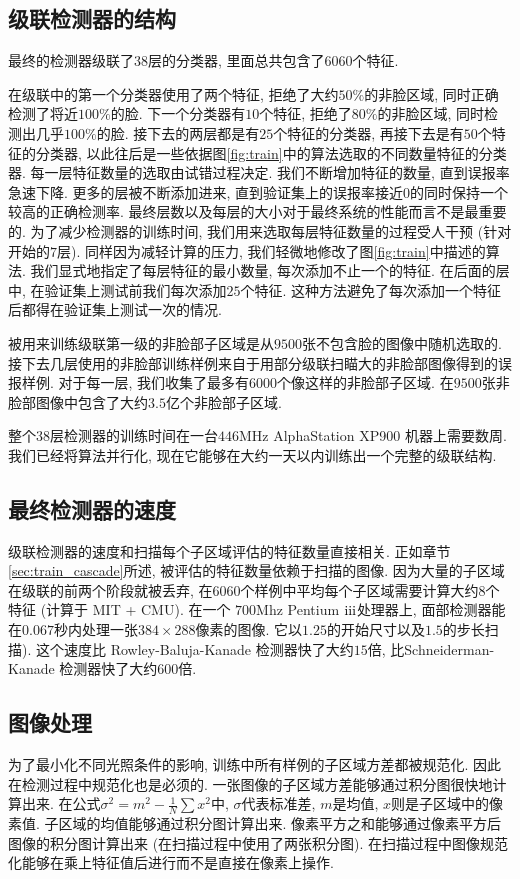 \documentclass[a4paper,utf8,11pt, onecolumn]{ctexart}
\newcommand{\RN}[1]{%
  \textup{\uppercase\expandafter{\romannumeral#1}}%
}
\begin{document}
\subsection{级联检测器的结构}
最终的检测器级联了$38$层的分类器, 里面总共包含了$6060$个特征.

在级联中的第一个分类器使用了两个特征, 拒绝了大约$50\%$的非脸区域, 同时正确检测了将近$100\%$的脸. 下一个分类器有$10$个特征, 拒绝了$80\%$的非脸区域, 同时检测出几乎$100\%$的脸.
接下去的两层都是有$25$个特征的分类器, 再接下去是有$50$个特征的分类器, 以此往后是一些依据图\ref{fig:train}中的算法选取的不同数量特征的分类器. 每一层特征数量的选取由试错过程决定. 我们不断增加特征的数量, 直到误报率急速下降. 更多的层被不断添加进来, 直到验证集上的误报率接近$0$的同时保持一个较高的正确检测率. 最终层数以及每层的大小对于最终系统的性能而言不是最重要的.
为了减少检测器的训练时间, 我们用来选取每层特征数量的过程受人干预 (针对开始的$7$层). 同样因为减轻计算的压力, 我们轻微地修改了图\ref{fig:train}中描述的算法. 我们显式地指定了每层特征的最小数量, 每次添加不止一个的特征. 在后面的层中, 在验证集上测试前我们每次添加$25$个特征.
这种方法避免了每次添加一个特征后都得在验证集上测试一次的情况.

被用来训练级联第一级的非脸部子区域是从$9500$张不包含脸的图像中随机选取的. 接下去几层使用的非脸部训练样例来自于用部分级联扫瞄大的非脸部图像得到的误报样例. 对于每一层, 我们收集了最多有$6000$个像这样的非脸部子区域. 在$9500$张非脸部图像中包含了大约$3.5$亿个非脸部子区域.

整个$38$层检测器的训练时间在一台$446$MHz AlphaStation XP900 机器上需要数周. 我们已经将算法并行化, 现在它能够在大约一天以内训练出一个完整的级联结构.

\subsection{最终检测器的速度}
级联检测器的速度和扫描每个子区域评估的特征数量直接相关. 正如章节\ref{sec:train_cascade}所述, 被评估的特征数量依赖于扫描的图像. 因为大量的子区域在级联的前两个阶段就被丢弃, 在$6060$个样例中平均每个子区域需要计算大约$8$个特征 (计算于 MIT + CMU\citep{rowley1998neural}). 在一个 $700$Mhz Pentium $\RN{3}$处理器上, 面部检测器能在$0.067$秒内处理一张$384\times288$像素的图像. 它以$1.25$的开始尺寸以及$1.5$的步长扫描). 这个速度比 Rowley-Baluja-Kanade 检测器\citep{rowley1998neural}快了大约$15$倍, 比Schneiderman-Kanade 检测器\citet{schneiderman2000statistical}快了大约$600$倍.

\subsection{图像处理}
为了最小化不同光照条件的影响, 训练中所有样例的子区域方差都被规范化. 因此在检测过程中规范化也是必须的. 一张图像的子区域方差能够通过积分图很快地计算出来. 在公式$\sigma^2=m^2-\frac1N\sum x^2$中, $\sigma$代表标准差, $m$是均值, $x$则是子区域中的像素值. 子区域的均值能够通过积分图计算出来. 像素平方之和能够通过像素平方后图像的积分图计算出来 (在扫描过程中使用了两张积分图).
在扫描过程中图像规范化能够在乘上特征值后进行而不是直接在像素上操作.
\end{document}
